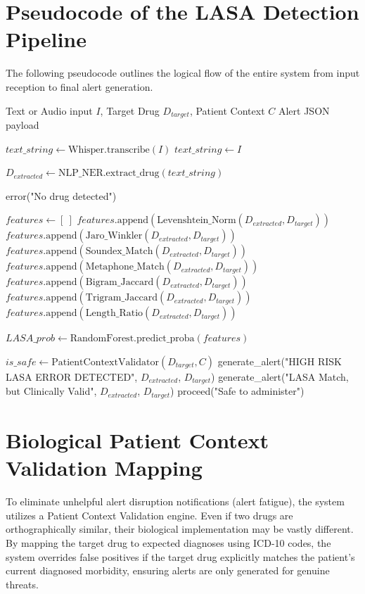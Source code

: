 \documentclass[12pt,a4paper]{report}
\begin{document}
\section{Pseudocode of the LASA Detection Pipeline}

The following pseudocode outlines the logical flow of the entire system from input reception to final alert generation.

\begin{algorithm}[H]
\caption{LASA Prediction and Context Validation Algorithm}
\begin{algorithmic}[1]
\Require Text or Audio input $I$, Target Drug $D_{target}$, Patient Context $C$
\Ensure Alert JSON payload

    \State $text\_string \gets \text{Whisper.transcribe}(I)$
\Else
    \State $text\_string \gets I$
\EndIf

\State $D_{extracted} \gets \text{NLP\_NER.extract\_drug}(text\_string)$

    \State \Return error("No drug detected")
\EndIf

\State $features \gets [~]$
\State $features.\text{append}(\text{Levenshtein\_Norm}(D_{extracted}, D_{target}))$
\State $features.\text{append}(\text{Jaro\_Winkler}(D_{extracted}, D_{target}))$
\State $features.\text{append}(\text{Soundex\_Match}(D_{extracted}, D_{target}))$
\State $features.\text{append}(\text{Metaphone\_Match}(D_{extracted}, D_{target}))$
\State $features.\text{append}(\text{Bigram\_Jaccard}(D_{extracted}, D_{target}))$
\State $features.\text{append}(\text{Trigram\_Jaccard}(D_{extracted}, D_{target}))$
\State $features.\text{append}(\text{Length\_Ratio}(D_{extracted}, D_{target}))$

\State $LASA\_prob \gets \text{RandomForest.predict\_proba}(features)$

    \State $is\_safe \gets \text{PatientContextValidator}(D_{target}, C)$
        \State \Return generate\_alert("HIGH RISK LASA ERROR DETECTED", $D_{extracted}$, $D_{target}$)
    \Else
        \State \Return generate\_alert("LASA Match, but Clinically Valid", $D_{extracted}$, $D_{target}$)
    \EndIf
\Else
    \State \Return proceed("Safe to administer")
\EndIf
\end{algorithmic}
\end{algorithm}

\section{Biological Patient Context Validation Mapping}
To eliminate unhelpful alert disruption notifications (alert fatigue), the system utilizes a Patient Context Validation engine. Even if two drugs are orthographically similar, their biological implementation may be vastly different. By mapping the target drug to expected diagnoses using ICD-10 codes, the system overrides false positives if the target drug explicitly matches the patient's current diagnosed morbidity, ensuring alerts are only generated for genuine threats.
\end{document}
